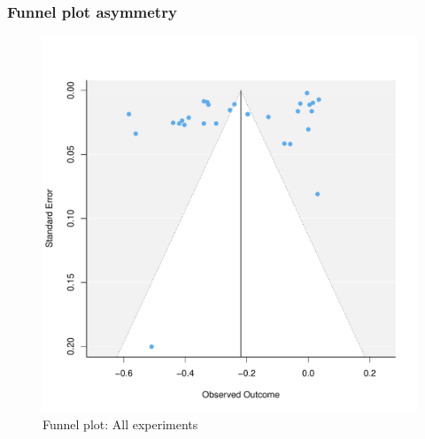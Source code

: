 \documentclass[usenames,dvipsnames]{beamer}
\begin{document}
\begin{frame}[label=supplemental]
\frametitle{Funnel plot asymmetry \hyperlink{pub_bias}{}}

\begin{figure}[!hb]
\vspace*{-3mm}
\includegraphics[scale = 0.45]{../figs/funnel_re_all.pdf}
\vspace{-0.2cm}
\caption{Funnel plot: All experiments}
\small
\vspace{-0.5cm}
\label{fig: funnel_all}
\end{figure}
\end{frame}

\end{document}

